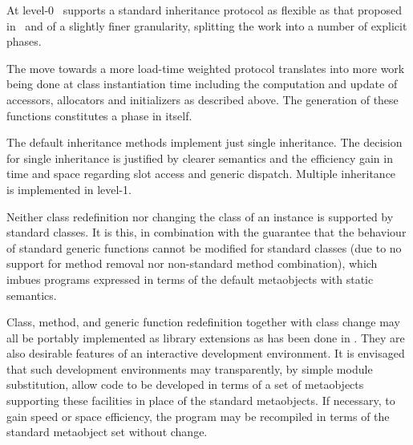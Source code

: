 \begin{optRationale}
    At level-0 \telos\ supports a standard inheritance protocol as flexible as
    that proposed in~ and of a slightly finer granularity,
    splitting the work into a number of explicit phases.

    The move towards a more load-time weighted protocol translates into more
    work being done at class instantiation time including the computation and
    update of accessors, allocators and initializers as described above. The
    generation of these functions constitutes a phase in itself.

    The default inheritance methods implement just single inheritance.  The
    decision for single inheritance is justified by clearer semantics and the
    efficiency gain in time and space regarding slot access and generic
    dispatch.  Multiple inheritance~ is implemented in
    level-1.

    Neither class redefinition nor changing the class of an instance is
    supported by standard classes. It is this, in combination with the guarantee
    that the behaviour of standard generic functions cannot be modified for
    standard classes (due to no support for method removal nor non-standard
    method combination), which imbues programs expressed in terms of the default
    metaobjects with static semantics.

    Class, method, and generic function redefinition together with class change
    may all be portably implemented as library extensions as has been done in
    \mcs.  They are also desirable features of an interactive development
    environment.  It is envisaged that such development environments may
    transparently, by simple module substitution, allow code to be developed in
    terms of a set of metaobjects supporting these facilities in place of the
    standard metaobjects. If necessary, to gain speed or space efficiency, the
    program may be recompiled in terms of the standard metaobject set without
    change.
\end{optRationale}
%
